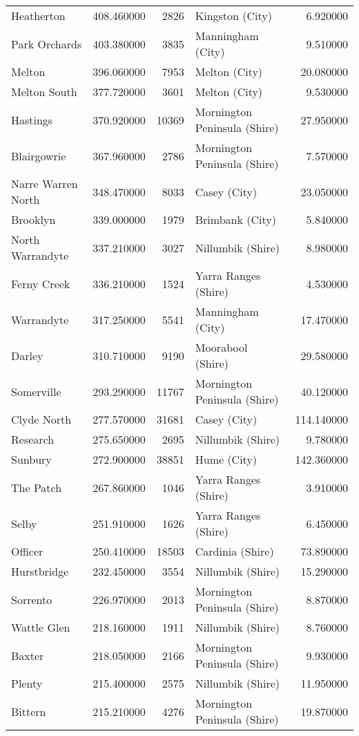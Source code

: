 \begin{table}
\begin{tabular}{lrrlr}
Heatherton & 408.460000 & 2826 & Kingston (City) & 6.920000 \\
Park Orchards & 403.380000 & 3835 & Manningham (City) & 9.510000 \\
Melton & 396.060000 & 7953 & Melton (City) & 20.080000 \\
Melton South & 377.720000 & 3601 & Melton (City) & 9.530000 \\
Hastings & 370.920000 & 10369 & Mornington Peninsula (Shire) & 27.950000 \\
Blairgowrie & 367.960000 & 2786 & Mornington Peninsula (Shire) & 7.570000 \\
Narre Warren North & 348.470000 & 8033 & Casey (City) & 23.050000 \\
Brooklyn & 339.000000 & 1979 & Brimbank (City) & 5.840000 \\
North Warrandyte & 337.210000 & 3027 & Nillumbik (Shire) & 8.980000 \\
Ferny Creek & 336.210000 & 1524 & Yarra Ranges (Shire) & 4.530000 \\
Warrandyte & 317.250000 & 5541 & Manningham (City) & 17.470000 \\
Darley & 310.710000 & 9190 & Moorabool (Shire) & 29.580000 \\
Somerville & 293.290000 & 11767 & Mornington Peninsula (Shire) & 40.120000 \\
Clyde North & 277.570000 & 31681 & Casey (City) & 114.140000 \\
Research & 275.650000 & 2695 & Nillumbik (Shire) & 9.780000 \\
Sunbury & 272.900000 & 38851 & Hume (City) & 142.360000 \\
The Patch & 267.860000 & 1046 & Yarra Ranges (Shire) & 3.910000 \\
Selby & 251.910000 & 1626 & Yarra Ranges (Shire) & 6.450000 \\
Officer & 250.410000 & 18503 & Cardinia (Shire) & 73.890000 \\
Hurstbridge & 232.450000 & 3554 & Nillumbik (Shire) & 15.290000 \\
Sorrento & 226.970000 & 2013 & Mornington Peninsula (Shire) & 8.870000 \\
Wattle Glen & 218.160000 & 1911 & Nillumbik (Shire) & 8.760000 \\
Baxter & 218.050000 & 2166 & Mornington Peninsula (Shire) & 9.930000 \\
Plenty & 215.400000 & 2575 & Nillumbik (Shire) & 11.950000 \\
Bittern & 215.210000 & 4276 & Mornington Peninsula (Shire) & 19.870000 \\

\end{tabular}
\end{table}
